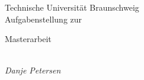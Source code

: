 \documentclass[a4paper,12pt,german]{article}
\begin{document}
\begin{titlepage}
\centering

\vspace*{4cm}
{\large Technische Universität Braunschweig} \\
\vspace{3cm}
{\Large Aufgabenstellung zur} \\
\vspace{1cm}
\begin{Huge}Masterarbeit\end{Huge} \\

\vspace{2cm}
{\Large \itshape Danje Petersen} \\

\end{titlepage}
\end{document}
